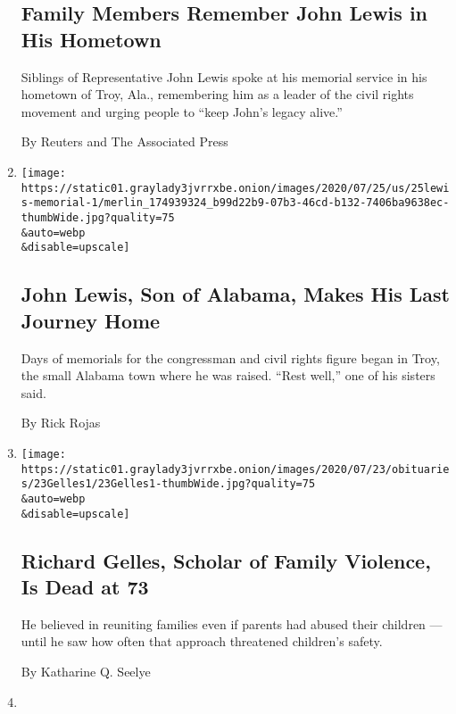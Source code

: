 \begin{enumerate}
{  \subsection{Family Members Remember John Lewis in His
  Hometown}\label{family-members-remember-john-lewis-in-his-hometown}}

  Siblings of Representative John Lewis spoke at his memorial service in
  his hometown of Troy, Ala., remembering him as a leader of the civil
  rights movement and urging people to ``keep John's legacy alive.''

  By Reuters and The Associated Press
\item
  \href{/2020/07/25/us/john-lewis-memorial-service.html}{}

  \texttt{[image: https://static01.graylady3jvrrxbe.onion/images/2020/07/25/us/25lewis-memorial-1/merlin\_174939324\_b99d22b9-07b3-46cd-b132-7406ba9638ec-thumbWide.jpg?quality=75\\\&auto=webp\\\&disable=upscale]}

  \hypertarget{john-lewis-son-of-alabama-makes-his-last-journey-home-1}{%
  \subsection{John Lewis, Son of Alabama, Makes His Last Journey
  Home}\label{john-lewis-son-of-alabama-makes-his-last-journey-home-1}}

  Days of memorials for the congressman and civil rights figure began in
  Troy, the small Alabama town where he was raised. ``Rest well,'' one
  of his sisters said.

  By Rick Rojas
\item
  \href{/2020/07/25/us/richard-gelles-dead.html}{}

  \texttt{[image: https://static01.graylady3jvrrxbe.onion/images/2020/07/23/obituaries/23Gelles1/23Gelles1-thumbWide.jpg?quality=75\\\&auto=webp\\\&disable=upscale]}

  \hypertarget{richard-gelles-scholar-of-family-violence-is-dead-at-73}{%
  \subsection{Richard Gelles, Scholar of Family Violence, Is Dead at
  73}\label{richard-gelles-scholar-of-family-violence-is-dead-at-73}}

  He believed in reuniting families even if parents had abused their
  children --- until he saw how often that approach threatened
  children's safety.

  By Katharine Q. Seelye
\item
  \href{/interactive/2020/07/25/us/hurricane-hanna-tracker-map.html}{}


\end{enumerate}
